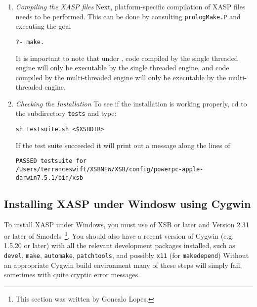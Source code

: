 \begin{enumerate}
\item {\em Compiling the XASP files} Next, platform-specific
  compilation of XASP files needs to be performed.  This can be done
  by consulting {\tt prologMake.P} and executing the goal
\begin{center}
  {\tt ?- make.}
\end{center}
It is important to note that under \version{}, code compiled by the
single threaded engine will only be executable by the single threaded
engine, and code compiled by the multi-threaded engine will only be
executable by the multi-threaded engine.
%
\item {\em Checking the Installation} 
%
To see if the installation is working properly, cd to the subdirectory
{\tt tests} and type: 

{\tt sh testsuite.sh <\$XSBDIR>}

If the test suite succeeded it will print out a message along the lines of 

\begin{small}
{\tt PASSED testsuite for /Users/terranceswift/XSBNEW/XSB/config/powerpc-apple-darwin7.5.1/bin/xsb}
\end{small}

\end{enumerate}

\subsection{Installing XASP under Windosw using Cygwin}

To install XASP under Windows, you must use \version{} of XSB or later
and Version 2.31 or later of Smodels~\footnote{This section was
  written by Goncalo Lopes.}.  You should also have a recent version
of Cygwin (e.g. 1.5.20 or later) with all the relevant development
packages installed, such as {\tt devel}, {\tt make}, {\tt automake},
{\tt patchtools}, and possibly {\tt x11} (for {\tt makedepend})
Without an appropriate Cygwin build environment many of these steps
will simply fail, sometimes with quite cryptic error messages.


